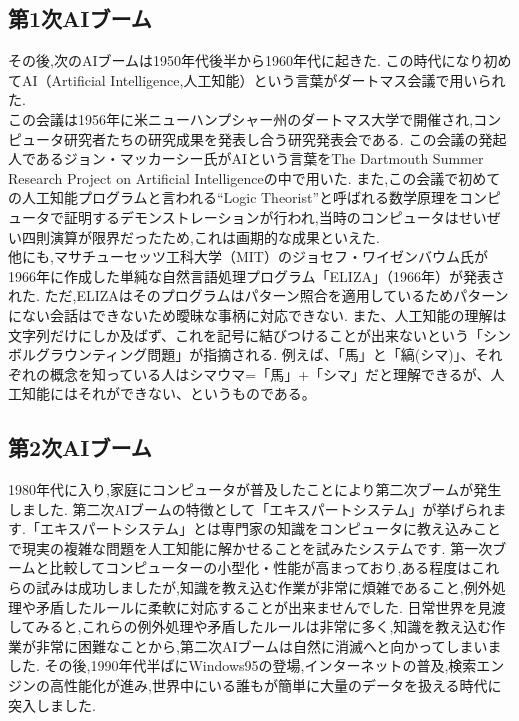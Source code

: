 \subsection{第1次AIブーム}
その後,次のAIブームは1950年代後半から1960年代に起きた.
この時代になり初めてAI（Artificial Intelligence,人工知能）という言葉がダートマス会議で用いられた.\\
この会議は1956年に米ニューハンプシャー州のダートマス大学で開催され,コンピュータ研究者たちの研究成果を発表し合う研究発表会である.\cite{webpage4}
この会議の発起人であるジョン・マッカーシー氏がAIという言葉をThe Dartmouth Summer Research Project on Artificial Intelligence\cite{ronbun2}の中で用いた.
また,この会議で初めての人工知能プログラムと言われる“Logic Theorist”と呼ばれる数学原理をコンピュータで証明するデモンストレーションが行われ,当時のコンピュータはせいぜい四則演算が限界だったため,これは画期的な成果といえた.\\
他にも,マサチューセッツ工科大学（MIT）のジョセフ・ワイゼンバウム氏が1966年に作成した単純な自然言語処理プログラム「ELIZA」（1966年）が発表された.
ただ,ELIZAはそのプログラムはパターン照合を適用しているためパターンにない会話はできないため曖昧な事柄に対応できない.
また、人工知能の理解は文字列だけにしか及ばず、これを記号に結びつけることが出来ないという「シンボルグラウンティング問題」が指摘される.
例えば、「馬」と「縞(シマ)」、それぞれの概念を知っている人はシマウマ=「馬」+「シマ」だと理解できるが、人工知能にはそれができない、というものである。
\subsection{第2次AIブーム}
1980年代に入り,家庭にコンピュータが普及したことにより第二次ブームが発生しました.
第二次AIブームの特徴として「エキスパートシステム」が挙げられます.「エキスパートシステム」とは専門家の知識をコンピュータに教え込みことで現実の複雑な問題を人工知能に解かせることを試みたシステムです.
第一次ブームと比較してコンピューターの小型化・性能が高まっており,ある程度はこれらの試みは成功しましたが,知識を教え込む作業が非常に煩雑であること,例外処理や矛盾したルールに柔軟に対応することが出来ませんでした.
日常世界を見渡してみると,これらの例外処理や矛盾したルールは非常に多く,知識を教え込む作業が非常に困難なことから,第二次AIブームは自然に消滅へと向かってしまいました.
その後,1990年代半ばにWindows95の登場,インターネットの普及,検索エンジンの高性能化が進み,世界中にいる誰もが簡単に大量のデータを扱える時代に突入しました.\\
